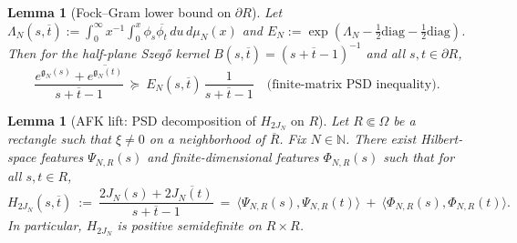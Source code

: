 \documentclass[11pt]{article}
\newtheorem{lemma}[theorem]{Lemma}
\theoremstyle{definition}
\theoremstyle{remark}
\begin{document}
\begin{lemma}[Fock–Gram lower bound on \(\partial R\)]\label{lem:fock-gram-formal}
Let \(\Lambda_N(s,\overline t):=\int_0^\infty x^{-1}\int_0^x \phi_s\overline{\phi_t}\,du\,d\mu_N(x)\) and \(E_N:=\exp(\Lambda_N-\tfrac12\mathrm{diag}-\tfrac12\mathrm{diag})\). Then for the half-plane Szeg\H{o} kernel \(B(s,\overline t)=(s+\overline t-1)^{-1}\) and all \(s,t\in\partial R\),
\[\frac{e^{\mathfrak g_N(s)}+\overline{e^{\mathfrak g_N(t)}}}{s+\overline t-1}\ \succeq\ E_N(s,\overline t)\,\frac{1}{s+\overline t-1}\quad\text{(finite-matrix PSD inequality).}\]
\end{lemma}
\begin{lemma}[AFK lift: PSD decomposition of \(H_{2J_N}\) on \(R\)]\label{lem:AFK}
Let \(R\Subset\Omega\) be a rectangle such that \(\xi\neq 0\) on a neighborhood of \(\overline R\). Fix \(N\in\mathbb N\). There exist Hilbert-space features \(\Psi_{N,R}(s)\) and finite-dimensional features \(\Phi_{N,R}(s)\) such that for all \(s,t\in R\),
\[
 H_{2J_N}(s,\overline t)\ :=\ \frac{2J_N(s)+2\overline{J_N(t)}}{s+\overline t-1}\ =\ \big\langle\Psi_{N,R}(s),\Psi_{N,R}(t)\big\rangle\ +\ \big\langle\Phi_{N,R}(s),\Phi_{N,R}(t)\big\rangle.
\]
In particular, \(H_{2J_N}\) is positive semidefinite on \(R\times R\).
\end{lemma}
\end{document}
